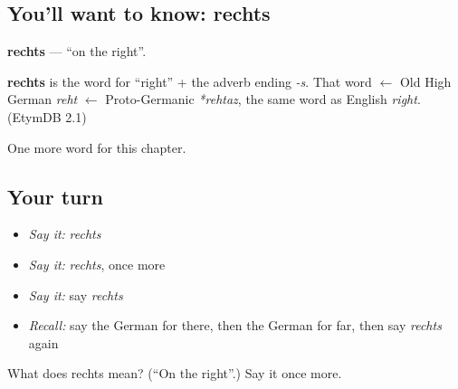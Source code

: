 \subsection*{You'll want to know: rechts}
\textbf{rechts} — \textquotedblleft{}on the right\textquotedblright{}.

\begin{cousinweb}
\textbf{rechts} is the word for \textquotedblleft{}right\textquotedblright{} + the adverb ending \emph{-s}. That word $\leftarrow$ Old High German \emph{reht} $\leftarrow$ Proto-Germanic \emph{*rehtaz}, the same word as English \emph{right}. (EtymDB 2.1)
\end{cousinweb}

\begin{grammarlens}[title={What you've built}]
One more word for this chapter.
\end{grammarlens}

\subsection*{Your turn}
\begin{itemize}
\raggedright
  \item \emph{Say it:} \emph{rechts}
  \item \emph{Say it:} \emph{rechts}, once more
  \item \emph{Say it:} say \emph{rechts}
  \item \emph{Recall:} say the German for there, then the German for far, then say \emph{rechts} again
\end{itemize}

\begin{tcolorbox}[breakable,colback=teal!4,colframe=teal!35!black,title={Before you move on}]
What does rechts mean? (\textquotedblleft{}On the right\textquotedblright{}.) Say it once more.
\end{tcolorbox}
